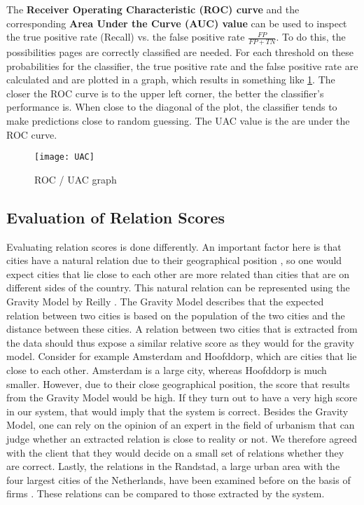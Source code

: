 The \textbf{Receiver Operating Characteristic (ROC) curve} and the corresponding \textbf{Area Under the Curve (AUC) value} can be used to inspect the true positive rate (Recall) vs. the false positive rate $\frac{FP}{FP + TN}$. To do this, the possibilities pages are correctly classified are needed. For each threshold on these probabilities for the classifier, the true positive rate and the false positive rate are calculated and are plotted in a graph, which results in something like \ref{fig:UAC}. The closer the ROC curve is to the upper left corner, the better the classifier's performance is. When close to the diagonal of the plot, the classifier tends to make predictions close to random guessing. The UAC value is the are under the ROC curve.


\begin{figure}[ht]
\centering
\texttt{[image: UAC]}
\caption{ROC / UAC graph \protect\footnotemark{}}
\label{fig:UAC}
\end{figure}

\subsection{Evaluation of Relation Scores} \label{sec:validation_protocol}
Evaluating relation scores is done differently. An important factor here is that cities have a natural relation due to their geographical position \cite{tobler1970computer}, so one would expect cities that lie close to each other are more related than cities that are on different sides of the country. This natural relation can be represented using the Gravity Model by Reilly \cite{reilly1931law}. The Gravity Model describes that the expected relation between two cities is based on the population of the two cities and the distance between these cities. A relation between two cities that is extracted from the data should thus expose a similar relative score as they would for the gravity model. Consider for example Amsterdam and Hoofddorp, which are cities that lie close to each other. Amsterdam is a large city, whereas Hoofddorp is much smaller. However, due to their close geographical position, the score that results from the Gravity Model would be high. If they turn out to have a very high score in our system, that would imply that the system is correct. Besides the Gravity Model, one can rely on the opinion of an expert in the field of urbanism that can judge whether an extracted relation is close to reality or not. We therefore agreed with the client that they would decide on a small set of relations whether they are correct. Lastly, the relations in the Randstad, a large urban area with the four largest cities of the Netherlands, have been examined before on the basis of firms \cite{van2010economic}. These relations can be compared to those extracted by the system.


